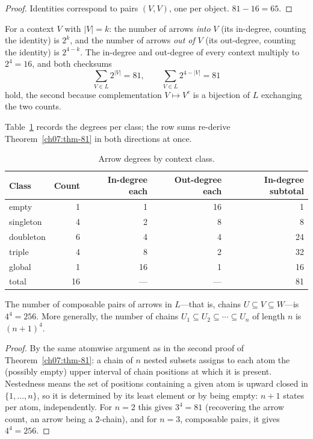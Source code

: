 \begin{proof}
Identities correspond to pairs $(V,V)$, one per object. $81-16=65$.
\end{proof}

\begin{corollary}\label{ch07:cor-degrees}
For a context $V$ with $|V|=k$: the number of arrows \emph{into} $V$ (its in-degree, counting the identity) is $2^{k}$, and the number of arrows \emph{out of} $V$ (its out-degree, counting the identity) is $2^{4-k}$. The in-degree and out-degree of every context multiply to $2^{4}=16$, and both checksums
\[
\sum_{V\in L}2^{|V|}=81,
\qquad
\sum_{V\in L}2^{4-|V|}=81
\]
hold, the second because complementation $V\mapsto V^{c}$ is a bijection of $L$ exchanging the two counts.
\end{corollary}

Table~\ref{ch07:tab-degrees} records the degrees per class; the row sums re-derive Theorem~\ref{ch07:thm-81} in both directions at once.

\begin{table}[htbp]
\centering
\caption{Arrow degrees by context class.}
\label{ch07:tab-degrees}
\begin{tabular}{@{}lrrrr@{}}
\toprule
Class & Count & In-degree each & Out-degree each & In-degree subtotal \\
\midrule
empty & 1 & 1 & 16 & 1 \\
singleton & 4 & 2 & 8 & 8 \\
doubleton & 6 & 4 & 4 & 24 \\
triple & 4 & 8 & 2 & 32 \\
global & 1 & 16 & 1 & 16 \\
\midrule
total & 16 & --- & --- & 81 \\
\bottomrule
\end{tabular}
\end{table}

\begin{proposition}[Chains]\label{ch07:prop-chains}
The number of composable pairs of arrows in $L$---that is, chains $U\subseteq V\subseteq W$---is $4^{4}=256$. More generally, the number of chains $U_{1}\subseteq U_{2}\subseteq\cdots\subseteq U_{n}$ of length $n$ is $(n+1)^{4}$.
\end{proposition}

\begin{proof}
By the same atomwise argument as in the second proof of Theorem~\ref{ch07:thm-81}: a chain of $n$ nested subsets assigns to each atom the (possibly empty) upper interval of chain positions at which it is present. Nestedness means the set of positions containing a given atom is upward closed in $\{1,\dots,n\}$, so it is determined by its least element or by being empty: $n+1$ states per atom, independently. For $n=2$ this gives $3^{4}=81$ (recovering the arrow count, an arrow being a $2$-chain), and for $n=3$, composable pairs, it gives $4^{4}=256$.
\end{proof}

